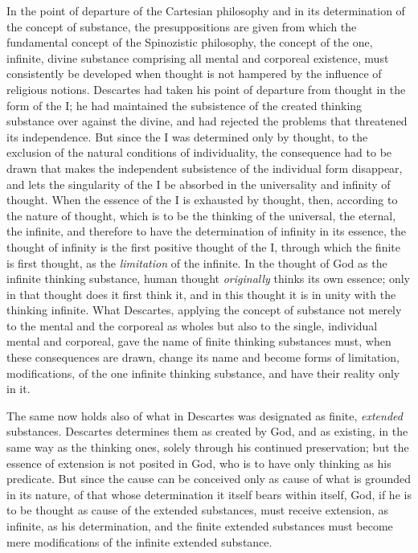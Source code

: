 \divrule

In the point of departure of the Cartesian philosophy and in its
determination of the concept of substance, the presuppositions are given
from which the fundamental concept of the Spinozistic philosophy, the
concept of the one, infinite, divine substance
comprising all mental and corporeal existence, must
consistently be developed when thought is not hampered by the influence
of religious notions. Descartes had taken his point of departure from
thought in the form of the I; he had maintained the subsistence of the
created thinking substance over against the divine, and had rejected the
problems that threatened its independence. But since the I was
determined only by thought, to the exclusion of the natural conditions
of individuality, the consequence had to be drawn that makes the
independent subsistence of the individual form disappear, and lets the
singularity of the I be absorbed in the universality and infinity of
thought. When the essence of the I is exhausted by thought, then,
according to the nature of thought, which is to be the thinking of the
universal, the eternal, the infinite, and therefore to have the
determination of infinity in its essence, the thought of infinity is the
first positive thought of the I, through which the finite is first
thought, as the \emph{limitation} of the infinite. In the thought of God
as the infinite thinking substance, human thought \emph{originally}
thinks its own essence; only in that thought does it first think it, and
in this thought it is in unity with the thinking infinite. What
Descartes, applying the concept of substance not merely to the mental
and the corporeal as wholes but also to the single, individual mental
and corporeal, gave the name of finite thinking substances must, when
these consequences are drawn, change its name and become forms of
limitation, modifications, of the one infinite thinking substance, and
have their reality only in it.

The same now holds also of what in Descartes was designated as finite,
\emph{extended} substances. Descartes determines them as created by God,
and as existing, in the same way as the thinking ones, solely through
his continued preservation; but the essence of extension is not posited
in God, who is to have only thinking as his predicate. But since the
cause can be conceived only as cause of what is grounded in its nature,
of that whose determination it itself bears within itself, God, if he is
to be thought as cause of the extended substances, must
receive extension, as infinite, as his determination, and the finite
extended substances must become mere modifications of the infinite
extended substance.


